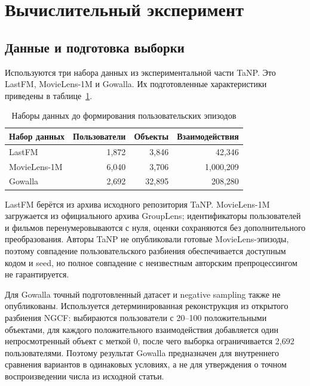\documentclass[12pt,a4paper]{article}
\begin{document}
\section{Вычислительный эксперимент}

\subsection{Данные и подготовка выборки}

Используются три набора данных из экспериментальной части TaNP. Это LastFM,
MovieLens-1M и Gowalla. Их подготовленные характеристики приведены в
таблице~\ref{tab:datasets}.

\begin{table}[H]
    \centering
    \caption{Наборы данных до формирования пользовательских эпизодов}
    \label{tab:datasets}
    \begin{tabular}{lrrr}
        \toprule
        Набор данных & Пользователи & Объекты & Взаимодействия \\
        \midrule
        LastFM & 1,872 & 3,846 & 42,346 \\
        MovieLens-1M & 6,040 & 3,706 & 1,000,209 \\
        Gowalla & 2,692 & 32,895 & 208,280 \\
        \bottomrule
    \end{tabular}
\end{table}

LastFM берётся из архива исходного репозитория TaNP. MovieLens-1M загружается
из официального архива GroupLens; идентификаторы пользователей и фильмов
перенумеровываются с нуля, оценки сохраняются без дополнительного
преобразования. Авторы TaNP не опубликовали готовые MovieLens-эпизоды, поэтому
совпадение пользовательского разбиения обеспечивается доступным кодом и seed,
но полное совпадение с неизвестным авторским препроцессингом не гарантируется.

Для Gowalla точный подготовленный датасет и negative sampling также не
опубликованы. Используется детерминированная реконструкция из открытого
разбиения NGCF: выбираются пользователи с 20--100 положительными объектами,
для каждого положительного взаимодействия добавляется один непросмотренный
объект с меткой 0, после чего выборка ограничивается 2,692 пользователями.
Поэтому результат Gowalla предназначен для внутреннего сравнения вариантов в
одинаковых условиях, а не для утверждения о точном воспроизведении числа из
исходной статьи.
\end{document}
